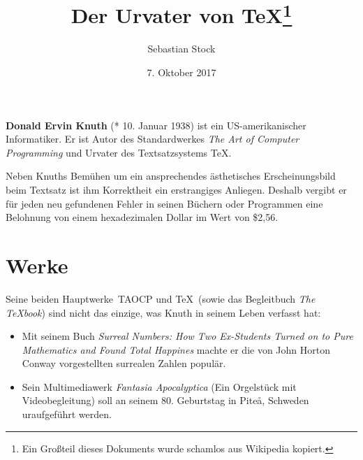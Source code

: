 \documentclass[a4paper. 11pts]{scrartcl}
\title{Der Urvater von \TeX \thanks{Ein Großteil dieses Dokuments wurde schamlos aus Wikipedia kopiert.}}
\author{Sebastian Stock}
\date{7. Oktober 2017}
\begin{document}
\maketitle
\noindent \textbf{Donald Ervin Knuth} (* 10. Januar 1938) ist ein US-amerikanischer Informatiker. Er ist Autor des Standardwerkes \textit{The Art of Computer Programming} und Urvater des Textsatzsystems \TeX.\par
Neben Knuths Bemühen um ein ansprechendes ästhetisches Erscheinungsbild beim Textsatz ist ihm Korrektheit ein erstrangiges Anliegen. Deshalb vergibt er für jeden neu gefundenen Fehler in seinen Büchern oder Programmen eine Belohnung von einem \glqq hexadezimalen Dollar \grqq im Wert von \$2,56.

\section{Werke}

Seine beiden  \glqq Hauptwerke\ \grqq \textsc{TAOCP} und \TeX\ (sowie das Begleitbuch \textit{The \TeX book})
sind nicht das einzige, was Knuth in seinem Leben verfasst hat:
\begin{itemize}
	\item Mit seinem Buch \textit{Surreal Numbers: How Two Ex-Students Turned on to Pure Mathematics and Found Total Happines} machte er die von John Horton Conway vorgestellten surrealen Zahlen populär.
	\item Sein Multimediawerk \textit{Fantasia Apocalyptica} (Ein Orgelstück mit Videobegleitung) soll an seinem 80. Geburtstag in Pite\aa, Schweden uraufgeführt werden.
\end{itemize}
\end{document}
